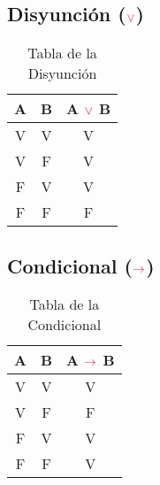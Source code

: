 \documentclass[11pt, a4paper]{article}
\begin{document}
    \textcolor{violeta1}{\subsection{\textbf{Disyunción ($\textcolor{rojo1}{\lor}$)}}}
    \begin{table}[ht]
        
        \begin{center}
            \caption{Tabla de la Disyunción}
            \vspace{4mm}
            \begin{tabular}{c c| c}
                \textcolor{verde1}{A} & \textcolor{violeta1}{B} & \textcolor{verde1}{A} $\textcolor{rojo1}{\lor} $ \textcolor{violeta1}{B} \\
                \hline 
                \textcolor{naranja1}{V} & \textcolor{naranja1}{V} & \textcolor{naranja1}{V} \\
                \textcolor{naranja1}{V} & \textcolor{azul1}{F}  & \textcolor{naranja1}{V} \\
                \textcolor{azul1}{F}  & \textcolor{naranja1}{V} & \textcolor{naranja1}{V} \\
                \textcolor{azul1}{F} & \textcolor{azul1}{F} & \textcolor{azul1}{F}\\
            \end{tabular}
        \end{center}
    \end{table}
    \newpage
    \textcolor{violeta1}{\subsection{\textbf{Condicional ($\textcolor{rojo1}{\rightarrow}$)}}}
    \begin{table}[ht]
        \begin{center}
            \caption{Tabla de la Condicional}
            \vspace{4mm}
            \begin{tabular}{c c| c}
                \textcolor{verde1}{A} & \textcolor{violeta1}{B} & \textcolor{verde1}{A} $\textcolor{rojo1}{\rightarrow} $ \textcolor{violeta1}{B} \\
                \hline 
                \textcolor{naranja1}{V} & \textcolor{naranja1}{V} & \textcolor{naranja1}{V} \\
                \textcolor{naranja1}{V} & \textcolor{azul1}{F}  & \textcolor{azul1}{F} \\
                \textcolor{azul1}{F}  & \textcolor{naranja1}{V} & \textcolor{naranja1}{V} \\
                \textcolor{azul1}{F} & \textcolor{azul1}{F} &  \textcolor{naranja1}{V} \\
            \end{tabular}
        \end{center}
    \end{table}
    
\end{document}

